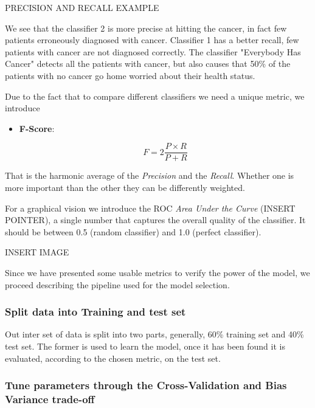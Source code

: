 PRECISION AND RECALL EXAMPLE

We see that the classifier 2 is more precise at hitting the cancer, in fact few patients erroneously diagnosed with cancer. Classifier 1 has a better recall, few patients with cancer are not diagnosed correctly. 
The classifier "Everybody Has Cancer" detects all the patients with cancer, but also causes that 50\% of the patients with no cancer go home worried about their health status.

Due to the fact that to compare different classifiers we need a unique metric, we introduce

\begin{itemize}
\item \textbf{F-Score}: 

$$F = 2 \frac{P \times R}{P + R}$$
\end{itemize}

That is the harmonic average of the \emph{Precision} and the \emph{Recall}. Whether one is more important than the other  they can be differently weighted.


For a graphical vision we introduce the ROC \emph{Area Under the Curve} (INSERT POINTER), a single number that captures the overall quality of the classifier. It should be between 0.5 (random classifier) and 1.0 (perfect classifier). 

INSERT IMAGE

Since we have presented some usable metrics to verify the power of the model, we proceed describing the pipeline used for the model selection.

\subsubsection*{Split data into Training and test set}

Out inter set of data is split into two parts, generally, 60\% training set and 40\% test set. The former is used to learn the model, once it has been found it is evaluated, according to the chosen metric, on the test set. 

\subsubsection*{Tune parameters through the Cross-Validation and Bias Variance trade-off}

